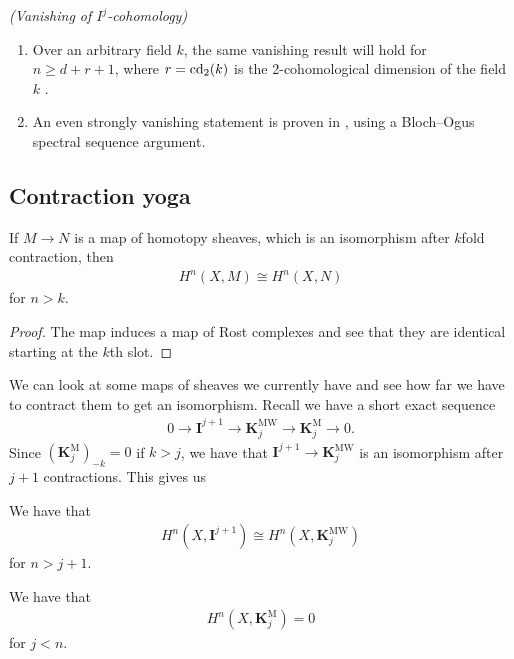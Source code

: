 \documentclass[11pt,openany]{book}
\providecommand{\KM}{\mathbf{K}^\mathrm{M}}
\providecommand{\KMW}{\mathbf{K}^\mathrm{MW}}
\begin{document}
\begin{remark} \textit{(Vanishing of $I^j$-cohomology)}
\begin{enumerate}
    \item Over an arbitrary field $k$, the same vanishing result will hold for $n \ge d+r+1$, where $r = \mathrm{cd}_2(k)$ is the 2-cohomological dimension of the field $k$ \cite[5.1]{AF3}.
    \item An even strongly vanishing statement is proven in \cite[5.2]{AF3}, using a Bloch--Ogus spectral sequence argument.
\end{enumerate}
\end{remark}

\subsection{Contraction yoga}

\begin{proposition} If $M\to N$ is a map of homotopy sheaves, which is an isomorphism after $k$fold contraction, then
\begin{align*}
    H^n(X,M) \cong H^n(X,N)
\end{align*}
for $n >k$.
\end{proposition}
\begin{proof} The map induces a map of Rost complexes and see that they are identical starting at the $k$th slot.
\end{proof}
%
We can look at some maps of sheaves we currently have and see how far we have to contract them to get an isomorphism. Recall we have a short exact sequence
\begin{align*}
    0 \to \mathbf{I}^{j+1} \to \KMW_j \to \KM_j \to 0.
\end{align*}
Since $(\KM_j)_{-k} = 0$ if $k>j$, we have that $\mathbf{I}^{j+1} \to \KMW_j$ is an isomorphism after $j+1$ contractions. This gives us

\begin{proposition} We have that
\begin{align*}
    H^n(X, \mathbf{I}^{j+1}) \cong H^n(X, \KMW_j)
\end{align*}
for $n > j+1$.
\end{proposition}

\begin{proposition} We have that
\begin{align*}
    H^n(X, \KM_j) = 0
\end{align*}
for $j<n$.
\end{proposition}
\end{document}
